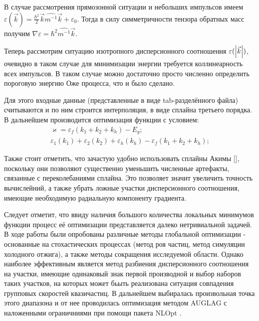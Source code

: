 \documentclass[../main.tex]{subfiles}
\begin{document}
        В случае рассмотрения
                прямозонной ситуации и небольших импульсов имеем 
                    $\varepsilon (\vec k) = \frac{\hbar^2}{2} \vec k \widehat{m^{-1}} \vec k + \varepsilon_0$.
                Тогда в силу симметричности тензора обратных масс получим $\nabla \varepsilon = \hbar^2 \widehat{m^{-1}} \vec k$.

        Теперь рассмотрим ситуацию изотропного дисперсионного соотношения $\varepsilon(\abs{\vec k})$,
        очевидно в таком случае для минимизации энергии требуется коллинеарность всех импульсов. 
        В таком случае можно достаточно просто численно определить пороговую энергию Оже процесса, что и было сделано.

        Для этого входные данные (представленные в виде tab-разделённого файла) считываются и по ним строится интерполяция,
        в виде сплайна третьего порядка. В дальнейшем производится оптимизация функции с условием:
        \begin{eqnarray}
            \varkappa  = \varepsilon_f(k_1 + k_2 + k_h) - E_g;\\
            \varepsilon_1(k_1) + \varepsilon_2(k_2) + \varepsilon_h(k_h) - \varepsilon_f(k_1 + k_2 + k_h);
        \end{eqnarray}

        Также стоит отметить, что зачастую удобно использовать сплайны Акимы [], поскольку они позволяют существенно уменьшить
        численные артефакты, связанные с переколебаниями сплайна. Это позволяет значит увеличить точность вычислейний, а также убрать ложные
        участки дисперсионного соотношения, имеющие необходимую радиальную компоненту градиента.

        Следует отметит, что ввиду наличия большого количества локальных минимумов функции процесс её оптимизации представляется далеко нетривиальной задачей.
        В ходе работы были опробованы различные методы глобальной оптимизации - основанные на стохастических процессах (метод роя частиц, метод 
        симуляции холодного отжига), а также методы сокращения исследуемой области. Однако наиболее эффективным является метод разбиения 
        дисперсионного соотношения на участки, имеющие одинаковый знак первой производной и выбор наборов таких участков,
        на которых может бьыть реализована ситуация совпадения групповых скоростей квазичастиц. В дальнейшем выбиралась произвольная точка этого диапазона
        и от нее проводилась оптимизация методом AUGLAG \cite{AuglagOptim} с наложенными ограничниями при помощи пакета NLOpt \cite{NLopt}.
\end{document}
